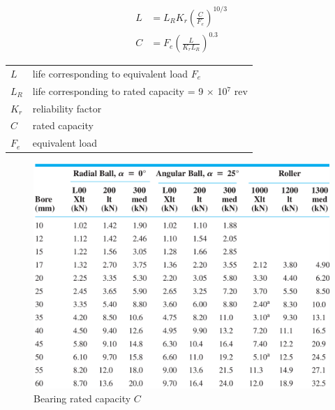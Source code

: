 \documentclass[a4paper,openany]{tufte-book}
\begin{document}
\begin{align}
    L &= L_R K_r \left( \frac{C}{F_e} \right)^{10/3} \\
    C &= F_e \left( \frac{L}{K_r L_R} \right)^{0.3}
\end{align}

\begin{center}
\begin{tabular}{ll}
\(L\) & life corresponding to equivalent load \(F_e\)\\
\(L_R\) & life corresponding to rated capacity = 9 \(\times\) 10\(^7\) rev\\
\(K_r\) & reliability factor\\
\(C\) & rated capacity\\
\(F_e\) & equivalent load\\
\end{tabular}
\end{center}


\begin{figure}[htbp]
\centering
\includegraphics[width=.9\linewidth]{./pictures/Bearings/bearing-rated-capacity.png}
\caption{Bearing rated capacity \(C\)}
\end{figure}
\end{document}
